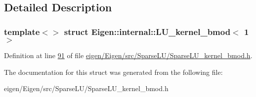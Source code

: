 \subsection{Detailed Description}
\subsubsection*{template$<$$>$\newline
struct Eigen\+::internal\+::\+L\+U\+\_\+kernel\+\_\+bmod$<$ 1 $>$}



Definition at line \hyperlink{eigen_2_eigen_2src_2_sparse_l_u_2_sparse_l_u__kernel__bmod_8h_source_l00091}{91} of file \hyperlink{eigen_2_eigen_2src_2_sparse_l_u_2_sparse_l_u__kernel__bmod_8h_source}{eigen/\+Eigen/src/\+Sparse\+L\+U/\+Sparse\+L\+U\+\_\+kernel\+\_\+bmod.\+h}.



The documentation for this struct was generated from the following file\+:\begin{DoxyCompactItemize}
\item 
eigen/\+Eigen/src/\+Sparse\+L\+U/\+Sparse\+L\+U\+\_\+kernel\+\_\+bmod.\+h\end{DoxyCompactItemize}
